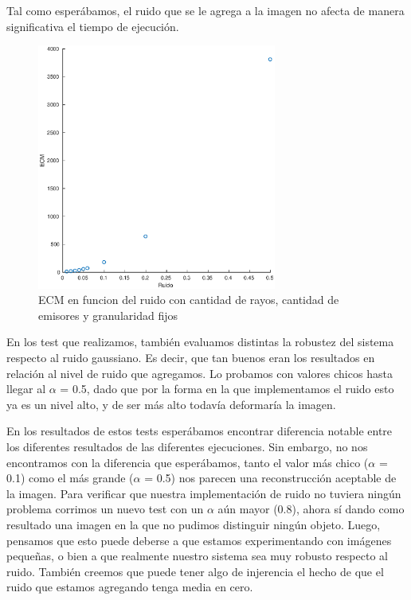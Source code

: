 \par Tal como esperábamos, el ruido que se le agrega a la imagen no afecta de manera significativa el tiempo de ejecuci\'on.

\begin{figure}[H]
	\centering	\includegraphics[width=0.7\textwidth]{img/ruido_ecm}
	\caption{ECM en funcion del ruido con cantidad de rayos, cantidad de emisores y granularidad fijos}
	\label{fig:ruido_ecm}
\end{figure}

\par En los test que realizamos, también evaluamos distintas la robustez del sistema respecto al ruido gaussiano. Es decir, que tan buenos eran los resultados en relación al nivel de ruido que agregamos.
Lo probamos con valores chicos hasta llegar al $\alpha$ = 0.5, dado que por la forma en la que implementamos el ruido esto ya es un nivel alto, y de ser más alto todavía deformaría la imagen.

\par En los resultados de estos tests esperábamos encontrar diferencia notable entre los diferentes resultados de las diferentes ejecuciones. Sin embargo, no nos encontramos con la diferencia que esperábamos, tanto el valor más chico ($\alpha$ = 0.1) como el más grande ($\alpha$ = 0.5) nos parecen una reconstrucción aceptable de la imagen.
Para verificar que nuestra implementación de ruido no tuviera ningún problema corrimos un nuevo test con un $\alpha$ aún mayor (0.8), ahora sí dando como resultado una imagen en la que no pudimos distinguir ningún objeto.
Luego, pensamos que esto puede deberse a que estamos experimentando con imágenes pequeñas, o bien a que realmente nuestro sistema sea muy robusto respecto al ruido. También creemos que puede tener algo de injerencia el hecho de que el ruido que estamos agregando tenga media en cero. 
